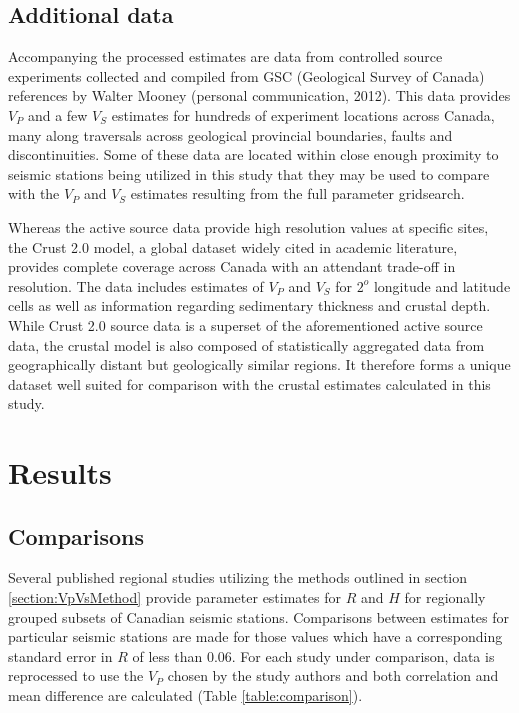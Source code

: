 \documentclass[draft, 12pt]{article}
\begin{document}
\subsection{Additional data}
   Accompanying the processed estimates are data from controlled source experiments collected and compiled from GSC (Geological Survey of Canada) references by Walter Mooney (personal communication, 2012). This data provides $V_P$ and a few $V_S$ estimates for hundreds of experiment locations across Canada, many along traversals across geological provincial boundaries, faults and discontinuities. Some of these data are located within close enough proximity to seismic stations being utilized in this study that they may be used to compare with the $V_P$ and $V_S$ estimates resulting from the full parameter gridsearch.

  Whereas the active source data provide high resolution values at specific sites, the Crust 2.0 model, a global dataset widely cited in academic literature, provides complete coverage across Canada with an attendant trade-off in resolution. The data includes estimates of $V_P$ and $V_S$ for $2^o$ longitude and latitude cells as well as information regarding sedimentary thickness and crustal depth. While Crust 2.0 source data is a superset of the aforementioned active source data, the crustal model is also composed of statistically aggregated data from geographically distant but geologically similar regions. It therefore forms a unique dataset well suited for comparison with the crustal estimates calculated in this study.

\section{Results}

\subsection{Comparisons}

  Several published regional studies utilizing the methods outlined in section \ref{section:VpVsMethod} provide parameter estimates for $R$ and $H$ for regionally grouped subsets of Canadian seismic stations. Comparisons between estimates for particular seismic stations are made for those values which have a corresponding standard error in $R$ of less than 0.06. For each study under comparison, data is reprocessed to use the $V_P$ chosen by the study authors and both correlation and mean difference are calculated (Table \ref{table:comparison}).
\end{document}
